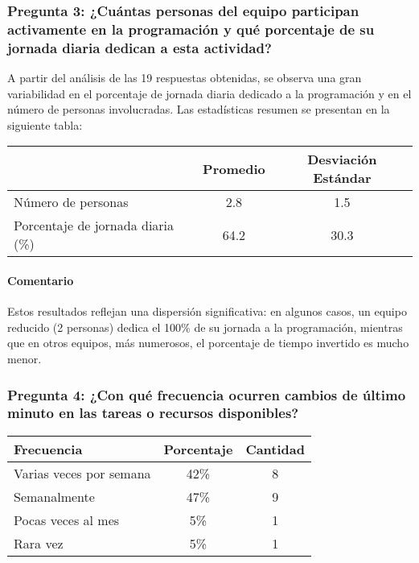 \documentclass{article}
\begin{document}
\vspace{1.5em}
\subsubsection*{Pregunta 3: ¿Cuántas personas del equipo participan activamente en la programación y qué porcentaje de su jornada diaria dedican a esta actividad?}

A partir del análisis de las 19 respuestas obtenidas, se observa una gran variabilidad en el porcentaje de jornada diaria dedicado a la programación y en el número de personas involucradas. Las estadísticas resumen se presentan en la siguiente tabla:

\begin{table}[H]
    \centering
    \begin{tabular}{lcc}
        \toprule
        & \textbf{Promedio} & \textbf{Desviación Estándar} \\
        \midrule
        Número de personas & 2.8 & 1.5 \\
        Porcentaje de jornada diaria (\%) & 64.2 & 30.3 \\
        \bottomrule
    \end{tabular}
    \label{tab:estadisticas_resumen_jornada}
\end{table}

\paragraph{Comentario} Estos resultados reflejan una dispersión significativa: en algunos casos, un equipo reducido (2 personas) dedica el 100\% de su jornada a la programación, mientras que en otros equipos, más numerosos, el porcentaje de tiempo invertido es mucho menor.


\vspace{1.5em}
\subsubsection*{Pregunta 4: ¿Con qué frecuencia ocurren cambios de último minuto en las tareas o recursos disponibles?}

\begin{table}[H]
    \centering
    \begin{tabular}{lcc}
        \toprule
        \textbf{Frecuencia} & \textbf{Porcentaje} & \textbf{Cantidad} \\
        \midrule
        Varias veces por semana & 42\% & 8 \\
        Semanalmente & 47\% & 9 \\
        Pocas veces al mes & 5\% & 1 \\
        Rara vez & 5\% & 1 \\
        \bottomrule
    \end{tabular}
    \label{tab:cambios_ultimo_minuto}
\end{table}
\end{document}
